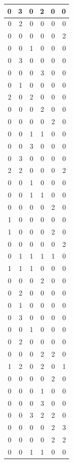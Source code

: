 \documentclass[
]{article}
\begin{document}
\begin{tabular}{r|r|r|r|r|r}
\hline
0 & 3 & 0 & 2 & 0 & 0\\
\hline
0 & 2 & 0 & 0 & 0 & 0\\
\hline
0 & 0 & 0 & 0 & 0 & 2\\
\hline
0 & 0 & 1 & 0 & 0 & 0\\
\hline
0 & 3 & 0 & 0 & 0 & 0\\
\hline
0 & 0 & 0 & 3 & 0 & 0\\
\hline
0 & 1 & 0 & 0 & 0 & 0\\
\hline
2 & 0 & 2 & 0 & 0 & 0\\
\hline
0 & 0 & 0 & 2 & 0 & 0\\
\hline
0 & 0 & 0 & 0 & 2 & 0\\
\hline
0 & 0 & 1 & 1 & 0 & 0\\
\hline
0 & 0 & 3 & 0 & 0 & 0\\
\hline
0 & 3 & 0 & 0 & 0 & 0\\
\hline
2 & 2 & 0 & 0 & 0 & 2\\
\hline
0 & 0 & 1 & 0 & 0 & 0\\
\hline
0 & 0 & 1 & 1 & 0 & 0\\
\hline
0 & 0 & 0 & 0 & 2 & 0\\
\hline
1 & 0 & 0 & 0 & 0 & 0\\
\hline
1 & 0 & 0 & 0 & 2 & 0\\
\hline
0 & 0 & 0 & 0 & 0 & 2\\
\hline
0 & 1 & 1 & 1 & 1 & 0\\
\hline
1 & 1 & 1 & 0 & 0 & 0\\
\hline
0 & 0 & 0 & 2 & 0 & 0\\
\hline
0 & 2 & 0 & 0 & 0 & 0\\
\hline
0 & 1 & 0 & 0 & 0 & 0\\
\hline
0 & 3 & 0 & 0 & 0 & 0\\
\hline
0 & 0 & 1 & 0 & 0 & 0\\
\hline
0 & 2 & 0 & 0 & 0 & 0\\
\hline
0 & 0 & 0 & 2 & 2 & 0\\
\hline
1 & 2 & 0 & 2 & 0 & 1\\
\hline
0 & 0 & 0 & 0 & 2 & 0\\
\hline
0 & 0 & 0 & 1 & 0 & 0\\
\hline
0 & 0 & 0 & 3 & 0 & 0\\
\hline
0 & 0 & 3 & 2 & 2 & 0\\
\hline
0 & 0 & 0 & 0 & 2 & 3\\
\hline
0 & 0 & 0 & 0 & 2 & 2\\
\hline
0 & 0 & 1 & 1 & 0 & 0\\

\end{tabular}
\end{document}

